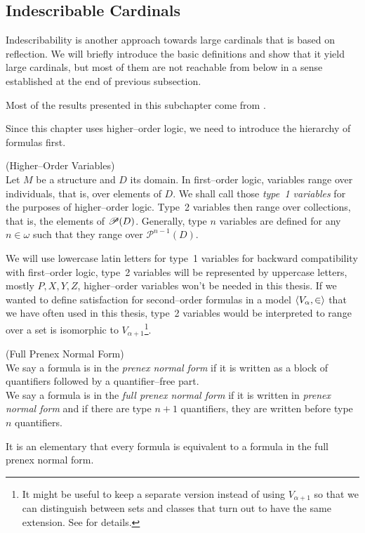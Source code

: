 \subsection{Indescribable Cardinals}

Indescribability is another approach towards large cardinals that is based on reflection. 
We will briefly introduce the basic definitions and show that it yield large cardinals, but most of them are not reachable from below in a sense established at the end of previous subsection.

Most of the results presented in this subchapter come from \cite{KanamoriBook}.

Since this chapter uses higher–order logic, we need to introduce the hierarchy of formulas first.

\begin{definition}{(Higher–Order Variables)}\label{def:higher_order_variables}\\
Let $M$ be a structure and $D$ its domain. In first–order logic, variables range over individuals, that is, over elements of $D$. We shall call those \emph{type~1 variables} for the purposes of higher–order logic. Type~2 variables then range over collections, that is, the elements of $\mathscr{P} (D)$. Generally, type $n$ variables are defined for any $n \in \omega$ such that they range over $\mathscr{P}^{n-1}(D)$.
\end{definition}
We will use lowercase latin letters for type~1 variables for backward compatibility with first–order logic, type~2 variables will be represented by uppercase letters, mostly $P, X, Y, Z$, higher–order variables won't be needed in this thesis. If we wanted to define satisfaction for second–order formulas in a model $\langle V_\alpha, \in \rangle$ that we have often used in this thesis, type~2 variables would be interpreted to range over a set is isomorphic to $V_{\alpha+1}$\footnote{It might be useful to keep a separate version instead of using $V_{\alpha+1}$ so that we can distinguish between sets and classes that turn out to have the same extension. See \cite{Koellner2009ORP} for details.}.

\begin{definition}{(Full Prenex Normal Form)}\label{def:pnf}\\
We say a formula is in the \emph{prenex normal form} if it is written as a block of quantifiers followed by a quantifier–free part.\\
We say a formula is in the \emph{full prenex normal form} if it is written in \emph{prenex normal form} and if there are type $n+1$ quantifiers, they are written before type $n$ quantifiers.
\end{definition}
It is an elementary that every formula is equivalent to a formula in the full prenex normal form.

